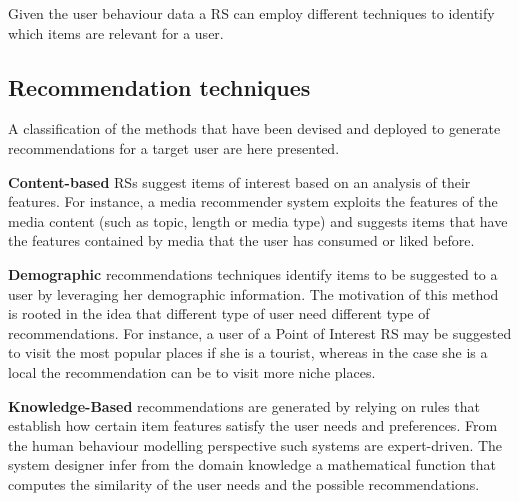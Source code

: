 Given the user behaviour data a RS can employ different techniques to identify which items are relevant for a user.

\subsection{Recommendation techniques}
A classification of the methods that have been devised and deployed to generate recommendations for a target user are here presented. \newline

\noindent\textbf{Content-based} RSs \cite{contentbased:lops} suggest items of interest based on an analysis of their features. For instance, a media recommender system 
exploits the features of the media content (such as topic, length or media 
type) and suggests items that have the features contained by media that 
the user has consumed or liked before. \newline

\noindent\textbf{Demographic} recommendations techniques \cite{demographic:RSdef} identify items to be suggested to a user by leveraging her demographic information. The motivation of this method is rooted in the idea that different type of user need different type of recommendations. For instance, a user of a Point of Interest RS may be suggested to visit the most popular places if she is a tourist, whereas in the case she is a local the recommendation can be to visit more niche places.\newline

\noindent\textbf{Knowledge-Based} recommendations \cite{kb:RSdef} are generated by relying on rules that establish how certain item features satisfy the user needs and preferences. From the human behaviour modelling perspective such systems are expert-driven. The system designer infer from the domain knowledge a mathematical function that computes the similarity of the user needs and the possible recommendations. \newline

